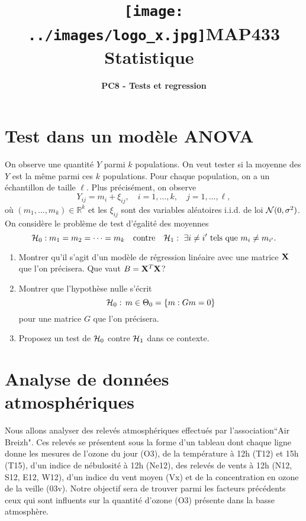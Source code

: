 \documentclass[a4paper,11pt,fleqn]{article}
\title{\texttt{[image: ../images/logo\_x.jpg]}\hfill {\bf MAP433 Statistique}\hfill \quad\quad\quad\quad\quad\quad \ }
\author{{\bf PC8 - Tests et regression}}
\date{}
\newcommand{\R}{\ensuremath{\mathbb{R}}}
\newcommand{\1}{\ensuremath{\mathbbm{1}}}
\begin{document}
\maketitle

\section{Test dans un mod\`ele ANOVA}

On observe une quantit\'e $Y$ parmi $k$ populations.  On veut tester si la moyenne des $Y$ est la m\^eme parmi ces $k$ populations. Pour chaque population, on a un \'echantillon de taille $\ell$. Plus pr\'ecis\'ement,
on observe
$$
Y_{ij}= m_i + \xi_{ij}, \quad i=1,\dots, k, \quad j=1,\dots, \ell,
$$
o\`u $(m_1,\dots,m_k)\in \R^k$ et les $\xi_{ij}$ sont des variables
al\'eatoires i.i.d. de loi ${\cal N}(0,\sigma^2)$. On consid\`ere le
probl\`eme de test d'\'egalit\'e des moyennes
$$ {\cal H}_0: m_1=m_2=\dots=m_k \quad\text{contre}\quad
{\cal H}_1: \text{ $\exists i\not=i'$ tels que $m_i\not=m_{i'}$}.$$
\begin{enumerate}
\item Montrer qu'il s'agit d'un mod\`ele de r\'egression lin\'eaire
avec une matrice ${\bf X}$ que l'on pr\'ecisera. Que vaut $B={\bf X}^T{\bf X}$?
\item Montrer que l'hypoth\`ese nulle s'\'ecrit
$${\cal H}_0:\, m\in \Theta_0= \{m: Gm =0\}$$ pour une
matrice $G$ que l'on pr\'ecisera.
\item Proposez un test de ${\cal H}_{0}$ contre ${\cal H}_{1}$ dans ce contexte.
\end{enumerate}








\section{Analyse de donn\'ees atmosph\'eriques}
Nous allons analyser des relev\'es atmosph\'eriques effectu\'es par l'association``Air Breizh".
Ces relev\'es se pr\'esentent sous la forme d'un tableau dont chaque ligne donne les mesures de l'ozone du jour (O3), de la temp\'erature \`a 12h (T12) et 15h (T15), d'un indice de n\'ebulosit\'e \`a 12h (Ne12), des relev\'es de vents \`a 12h (N12, S12, E12, W12),
d'un indice du vent moyen (Vx) et de la concentration en ozone de la veille (03v).
Notre objectif sera de trouver parmi  les facteurs pr\'ec\'edents ceux qui sont influents sur la quantit\'e d'ozone (O3) pr\'esente dans la basse atmosph\`ere.  \medskip
\end{document}
